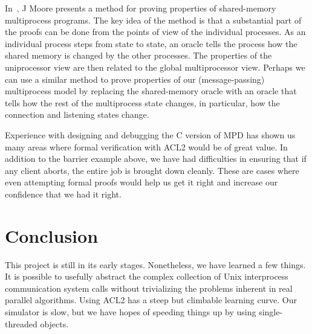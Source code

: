\documentclass{article}
\begin{document}
In~\cite{moore:multi}, J Moore presents a method for proving
properties of shared-memory multiprocess programs.  The key idea of
the method is that a substantial part of the proofs can be done from
the points of view of the individual processes.  As an individual
process steps from state to state, an oracle tells the process how the
shared memory is changed by the other processes.  The properties of
the uniprocessor view are then related to the global multiprocessor
view.  Perhaps we can use a similar method to prove properties of our
(message-passing) multiprocess model by replacing the shared-memory
oracle with an oracle that tells how the rest of the multiprocess
state changes, in particular, how the connection and listening states
change.

Experience with designing and debugging the C version
of MPD has shown us many areas where formal verification
with ACL2 would be of great value.  
In addition to the barrier example above, we have had difficulties in ensuring
that if any client aborts, the entire job is brought down cleanly.  These are
cases where even attempting formal proofs would help us get it right and
increase our confidence that we had it right.

\section{Conclusion}

This project is still in its early stages.  Nonetheless, we have learned a few
things.  It is possible to usefully abstract the complex collection of Unix
interprocess communication system calls without trivializing the problems
inherent in real parallel algorithms.  Using ACL2 has a steep but climbable
learning curve.  Our simulator is slow, but we have hopes of speeding things
up by using single-threaded objects.



% 
\end{document}
